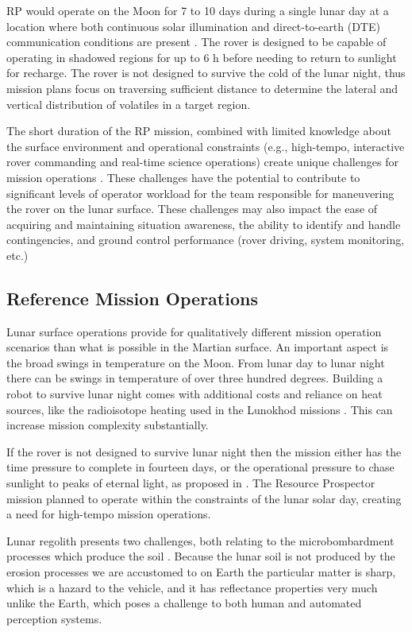 \documentclass[twocolumn,letterpaper]{IEEEAerospaceCLS}  %
\begin{document}
RP would operate on the Moon for 7 to 10 days during a single lunar day at a location where both continuous solar illumination and direct-to-earth (DTE) communication conditions are present \cite{trimble2016lunar}. 
The rover is designed to be capable of operating in shadowed regions for up to 6 h before needing to return to sunlight for recharge. 
The rover is not designed to survive the cold of the lunar night, thus mission plans focus on traversing sufficient distance to determine the lateral and vertical distribution of volatiles in a target region.

The short duration of the RP mission, combined with limited knowledge about the surface environment and operational constraints (e.g., high-tempo, interactive rover commanding and real-time science operations) create unique challenges for mission operations \cite{hooey2017modeling}. 
These challenges have the potential to contribute to significant levels of operator workload for the team responsible for maneuvering the rover on the lunar surface. 
These challenges may also impact the ease of acquiring and maintaining situation awareness, the ability to identify and handle contingencies, and ground control performance (rover driving, system monitoring, etc.)

\subsection{Reference Mission Operations}
Lunar surface operations provide for qualitatively different mission operation scenarios than what is possible in the Martian surface.  
An important aspect is the broad swings in temperature on the Moon.  
From lunar day to lunar night there can be swings in temperature of over three hundred degrees.  
Building a robot to survive lunar night comes with additional costs and reliance on heat sources, like the radioisotope heating used in the Lunokhod missions \cite{ulamec2010survive}.  
This can increase mission complexity substantially.  

If the rover is not designed to survive lunar night then the mission either has the time pressure to complete in fourteen days, or the operational pressure to chase sunlight to peaks of eternal light, as proposed in \cite{otten2018strategic}.  
The Resource Prospector mission planned to operate within the constraints of the lunar solar day, creating a need for high-tempo mission operations. 

Lunar regolith presents two challenges, both relating to the microbombardment processes which produce the soil \cite{XXX}.  
Because the lunar soil is not produced by the erosion processes we are accustomed to on Earth the particular matter is sharp, which is a hazard to the vehicle, and it has reflectance properties very much unlike the Earth, which poses a challenge to both human and automated perception systems. 
\end{document}
